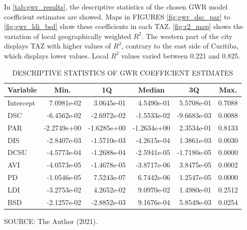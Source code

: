 
In \autoref{tab:gwr_results}, the descriptive statistics of the chosen GWR model coefficient estimates are showed. Maps in FIGURES \ref{fig:gwr_dsc_par} to \ref{fig:gwr_ldi_bsd} show these coefficients in each TAZ. \autoref{fig:r2_map} shows the variation of local geographically weighted $R^2$. The western part of the city displays TAZ with higher values of $R^2$, contrary to the east side of Curitiba, which displays lower values. Local $R^2$ values varied between 0.221 and 0.825. 

\begin{table}[!htbp]
    \footnotesize
    \captionsetup{justification=raggedright,
        singlelinecheck=false,
        font=footnotesize}
    \caption{DESCRIPTIVE STATISTICS OF GWR COEFFICIENT ESTIMATES}
    \centering
    \begin{tabular}{lrrrrr}
        \hline
        \multicolumn{1}{c}{\textbf{Variable}} & \multicolumn{1}{c}{\textbf{Min.}} & \multicolumn{1}{c}{\textbf{1Q}} & \multicolumn{1}{c}{\textbf{Median}} & \multicolumn{1}{c}{\textbf{3Q}} & \multicolumn{1}{c}{\textbf{Max.}} \\
        \hline
        Intercept & 7.0981e-02 & 3.0645e-01 & 4.5490e-01 & 5.5708e-01 & 0.7088 \\
        DSC       & -6.4562e-02 & -2.6972e-02 & -1.5533e-02 & -9.6683e-03 & 0.0088 \\
        PAR       & -2.2749e+00 & -1.6285e+00 & -1.2634e+00 & 2.3534e-01 & 0.8133 \\
        DIS       & -2.8407e-03 & -1.5710e-03 & -4.2615e-04 & 1.3861e-03 & 0.0030 \\
        DCSU      & -4.5773e-04 & -1.2688e-04 & -2.5941e-05 & -1.7180e-05 & 0.0000 \\
        AVI       & -4.0573e-05 & -1.4678e-05 & -3.8717e-06 & 3.8475e-05 & 0.0002 \\
        PD        & -1.0546e-05 & 7.5243e-07 & 6.7442e-06 & 1.2547e-05 & 0.0000 \\
        LDI       & -3.2753e-02 & 4.2652e-02 & 9.0970e-02 & 1.4980e-01 & 0.2512 \\
        BSD       & -2.1257e-02 & -2.8852e-03 & 9.1676e-04 & 5.8549e-03 & 0.0254 \\
        \hline
    \end{tabular}
    \label{tab:gwr_results}
    \par \vspace{2mm} \footnotesize \raggedright
    SOURCE: The Author (2021).
\end{table}

